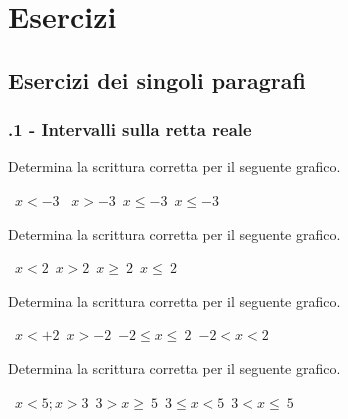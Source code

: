 
\section{Esercizi}
\subsection{Esercizi dei singoli paragrafi}
\subsubsection*{\thechapter.1 - Intervalli sulla retta reale}

\begin{esercizio}
 \label{ese:21.1}
 Determina la scrittura corretta per il seguente grafico.
 \begin{center}
  

 \boxA\quad~$x<-3$ \quad\boxB\quad~$x>-3$\quad\boxC\quad~$x\le -3$\quad\boxD\quad~$x\le -3$
 \end{center}

\end{esercizio}

\begin{esercizio}
 \label{ese:21.2}
 Determina la scrittura corretta per il seguente grafico.
  \begin{center}
  

\boxA\quad~$x<2$\quad\boxB\quad~$x>2$\quad\boxC\quad~$x\ge~2$\quad\boxD\quad~$x\le~2$
 \end{center}
\end{esercizio}

\begin{esercizio}
 \label{ese:21.3}
 Determina la scrittura corretta per il seguente grafico.
  \begin{center}
  

\boxA\quad~$x<+2$\quad\boxB\quad~$x>-2$\quad\boxC\quad~$-2\le x\le~2$\quad\boxD\quad~$-2<x<2$
 \end{center}
\end{esercizio}

\begin{esercizio}
 \label{ese:21.4}
 Determina la scrittura corretta per il seguente grafico.
  \begin{center}
  

  \boxA\quad~$x<5;x>3$\quad\boxB\quad~$3>x\ge~5$\quad\boxC\quad~$3\le x<5$\quad\boxD\quad~$3<x\le~5$
 \end{center}
  \end{esercizio}

